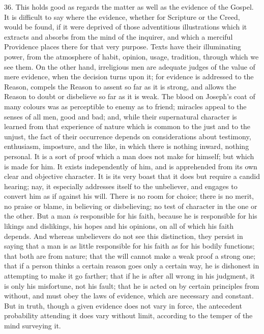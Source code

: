 36. This holds good as regards the matter as well as the evidence
of the Gospel. It is difficult to say where the evidence, whether for
Scripture or the Creed, would be found, if it were deprived of those
adventitious illustrations which it extracts and absorbs from the mind
of the inquirer, and which a merciful Providence places there for that
very purpose. Texts have their illuminating power, from the atmosphere
of habit, opinion, usage, tradition, through which we see them. On the
other hand, irreligious men are adequate judges of the value of mere
evidence, when the decision turns upon it; for evidence is addressed
to the Reason, compels the Reason to assent so far as it is strong,
and allows the Reason to doubt or disbelieve so far as it is weak. The
blood on Joseph's coat of many colours was as perceptible to enemy as
to friend; miracles appeal to the senses of all men, good and bad;
and, while their supernatural character is learned from that
experience of nature which is common to the just and to the unjust,
the fact of their occurrence depends on considerations about
testimony, enthusiasm, imposture, and the like, in which there is
nothing inward, nothing personal. It is a sort of proof which a man
does not make for himself; but which is made for him. It exists
independently of him, and is apprehended from its own clear and
objective character. It is its very boast that it does but require a
candid hearing; nay, it especially addresses itself to the unbeliever,
and engages to convert him as if against his will. There is no room
for choice; there is no merit, no praise or blame, in believing or
disbelieving; no test of character in the one or the other. But a man \emph{is}
responsible for his faith, because he is responsible for his likings
and dislikings, his hopes and his opinions, on all of which his faith
depends. And whereas unbelievers do not see this distinction, they
persist in saying that a man is as little responsible for his faith as
for his bodily functions; that both are from nature; that the will
cannot make a weak proof a strong one; that if a person thinks a
certain reason goes only a certain way, he is dishonest in attempting
to make it go farther; that if he is after all wrong in his judgment,
it is only his misfortune, not his fault; that he is acted on by
certain principles from without, and must obey the laws of evidence,
which are necessary and constant. But in truth, though a given
evidence does not vary in force, the antecedent probability attending
it does vary without limit, according to the temper of the mind
surveying it.

